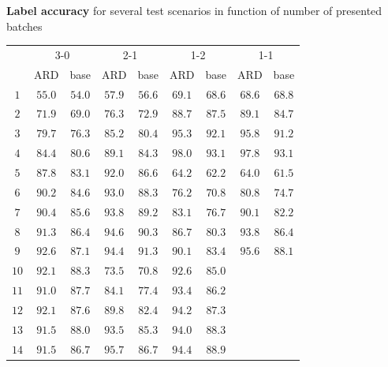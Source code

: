 \documentclass[a0,sans]{esatposter}
\begin{document}
{
	{
\begin{minipage}{\linewidth}
\centering
\large
\textbf{Label accuracy} for several test scenarios in function of number of presented batches\\
\Large
\vspace{1cm}
\begin{tabular}{|c|cc|cc|cc|cc|}
\hline
 & \multicolumn{2}{c|}{3-0} & \multicolumn{2}{c|}{2-1} & \multicolumn{2}{c|}{1-2} & \multicolumn{2}{c|}{1-1}\\
 & ARD & base & ARD & base & ARD & base & ARD & base\\
 \hline
$1$ & $55.0$ & $54.0$ & $57.9$ & $56.6$ & $69.1$ & $68.6$ & $68.6$ & $68.8$\\
$2$ & $71.9$ & $69.0$ & $76.3$ & $72.9$ & $88.7$ & $87.5$ & $89.1$ & $84.7$\\
$3$ & $79.7$ & $76.3$ & $85.2$ & $80.4$ & $95.3$ & $92.1$ & $95.8$ & $91.2$\\
$4$ & $84.4$ & $80.6$ & $89.1$ & $84.3$ & $98.0$ & $93.1$ & $97.8$ & $93.1$\\
\cline{6-9}
$5$ & $87.8$ & $83.1$ & $92.0$ & $86.6$ & $64.2$ & $62.2$ & $64.0$ & $61.5$\\
$6$ & $90.2$ & $84.6$ & $93.0$ & $88.3$ & $76.2$ & $70.8$ & $80.8$ & $74.7$\\
$7$ & $90.4$ & $85.6$ & $93.8$ & $89.2$ & $83.1$ & $76.7$ & $90.1$ & $82.2$\\
$8$ & $91.3$ & $86.4$ & $94.6$ & $90.3$ & $86.7$ & $80.3$ & $93.8$ & $86.4$\\
$9$ & $92.6$ & $87.1$ & $94.4$ & $91.3$ & $90.1$ & $83.4$ & $95.6$ & $88.1$\\
\cline{4-5}
$10$ & $92.1$ & $88.3$ & $73.5$ & $70.8$ & $92.6$ & $85.0$ &  & \\
$11$ & $91.0$ & $87.7$ & $84.1$ & $77.4$ & $93.4$ & $86.2$ &  & \\
$12$ & $92.1$ & $87.6$ & $89.8$ & $82.4$ & $94.2$ & $87.3$ &  & \\
$13$ & $91.5$ & $88.0$ & $93.5$ & $85.3$ & $94.0$ & $88.3$ &  & \\
$14$ & $91.5$ & $86.7$ & $95.7$ & $86.7$ & $94.4$ & $88.9$ &  & \\
\hline
\end{tabular}
\end{minipage}
\vspace{2cm}

}}
\end{document}
